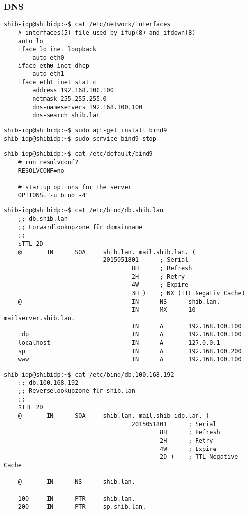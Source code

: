 \subsubsection{DNS}
\begin{lstlisting}
shib-idp@shibidp:~$ cat /etc/network/interfaces
	# interfaces(5) file used by ifup(8) and ifdown(8)
	auto lo
	iface lo inet loopback
		auto eth0
	iface eth0 inet dhcp
		auto eth1
	iface eth1 inet static
		address 192.168.100.100
		netmask 255.255.255.0
		dns-nameservers 192.168.100.100
		dns-search shib.lan
\end{lstlisting}
\begin{lstlisting}
shib-idp@shibidp:~$ sudo apt-get install bind9
shib-idp@shibidp:~$ sudo service bind9 stop
\end{lstlisting}
\begin{lstlisting}
shib-idp@shibidp:~$ cat /etc/default/bind9 
	# run resolvconf?
	RESOLVCONF=no

	# startup options for the server
	OPTIONS="-u bind -4"
\end{lstlisting}	
\begin{lstlisting}
shib-idp@shibidp:~$ cat /etc/bind/db.shib.lan 
	;; db.shib.lan
	;; Forwardlookupzone für domainname
	;;
	$TTL 2D
	@       IN      SOA     shib.lan. mail.shib.lan. (
							2015051801      ; Serial
									8H      ; Refresh
									2H      ; Retry
									4W      ; Expire
									3H )    ; NX (TTL Negativ Cache)
	@                               IN      NS      shib.lan.
									IN      MX      10 mailserver.shib.lan.
									IN      A       192.168.100.100
	idp                             IN      A       192.168.100.100
	localhost                       IN      A       127.0.0.1
	sp                              IN      A       192.168.100.200
	www                             IN      A       192.168.100.100

\end{lstlisting}
\begin{lstlisting}
shib-idp@shibidp:~$ cat /etc/bind/db.100.168.192 
	;; db.100.168.192
	;; Reverselookupzone für shib.lan
	;;
	$TTL 2D
	@       IN      SOA     shib.lan. mail.shib-idp.lan. (
									2015051801      ; Serial
											8H      ; Refresh
											2H      ; Retry
											4W      ; Expire
											2D )    ; TTL Negative Cache

	@       IN      NS      shib.lan.

	100     IN      PTR     shib.lan.
	200     IN      PTR     sp.shib.lan.
\end{lstlisting}

